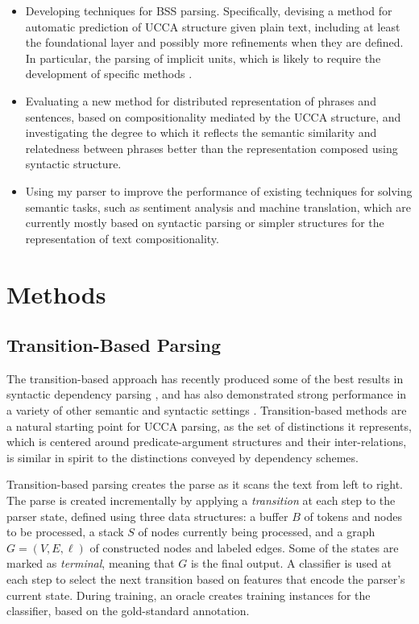 \documentclass[12pt]{article}
\begin{document}
\begin{itemize}
  \item Developing techniques for BSS parsing.
    Specifically, devising a method for automatic prediction of UCCA
    structure given plain text, including at least the foundational layer and possibly more
    refinements when they are defined.
    In particular, the parsing of implicit units, which is likely to require
    the development of specific methods \cite{roth2015inducing}.
  \item Evaluating a new method for distributed representation of phrases
    and sentences, based on compositionality mediated by the UCCA structure,
    and investigating the degree to which it reflects the semantic similarity and relatedness
    between phrases better than the representation composed using syntactic structure.
  \item Using my parser to improve the performance of
    existing techniques for solving semantic tasks, such as sentiment analysis
    and machine translation, which are currently mostly based on syntactic
    parsing or simpler structures for the representation of text
    compositionality.
\end{itemize}


\section{Methods}\label{sec:methods}

\subsection{Transition-Based Parsing}\label{sec:transition_based}

The transition-based approach has recently produced some of the best
results in syntactic dependency parsing
\cite{dyer2015transition,ballesteros2015improved}, and has also demonstrated
strong performance in a variety of other semantic and syntactic settings
\cite[among others]{maier2015discontinuous,wang2015transition}.
Transition-based methods are a natural starting point for UCCA parsing,
as the set of distinctions it represents, which is centered around predicate-argument
structures and their inter-relations, is similar in spirit to the distinctions
conveyed by dependency schemes.

Transition-based parsing \cite{Nivre03anefficient} creates the parse
as it scans the text from left to right.
The parse is created incrementally by applying a \textit{transition} at each step to the parser state,
defined using three data structures: a buffer $B$ of tokens and nodes to be processed,
a stack $S$ of nodes currently being processed,
and a graph $G=(V,E,\ell)$ of constructed nodes and labeled edges.
Some of the states are marked as \textit{terminal}, meaning that $G$ is the final output.
A classifier is used at each step to select the next transition based on features
that encode the parser's current state.
During training, an oracle creates training instances for the classifier,
based on the gold-standard annotation.
\end{document}

